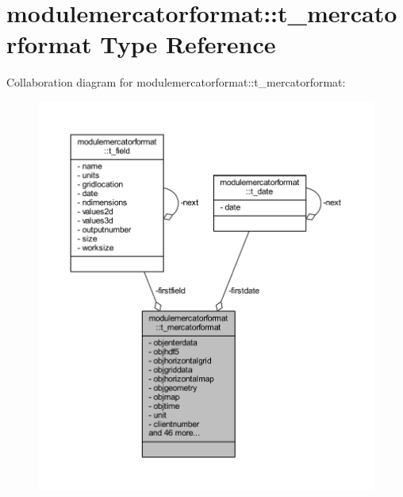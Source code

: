 \hypertarget{structmodulemercatorformat_1_1t__mercatorformat}{}\section{modulemercatorformat\+:\+:t\+\_\+mercatorformat Type Reference}
\label{structmodulemercatorformat_1_1t__mercatorformat}


Collaboration diagram for modulemercatorformat\+:\+:t\+\_\+mercatorformat\+:\nopagebreak
\begin{figure}[H]
\begin{center}
\leavevmode
\includegraphics[width=350pt]{structmodulemercatorformat_1_1t__mercatorformat__coll__graph}
\end{center}
\end{figure}
